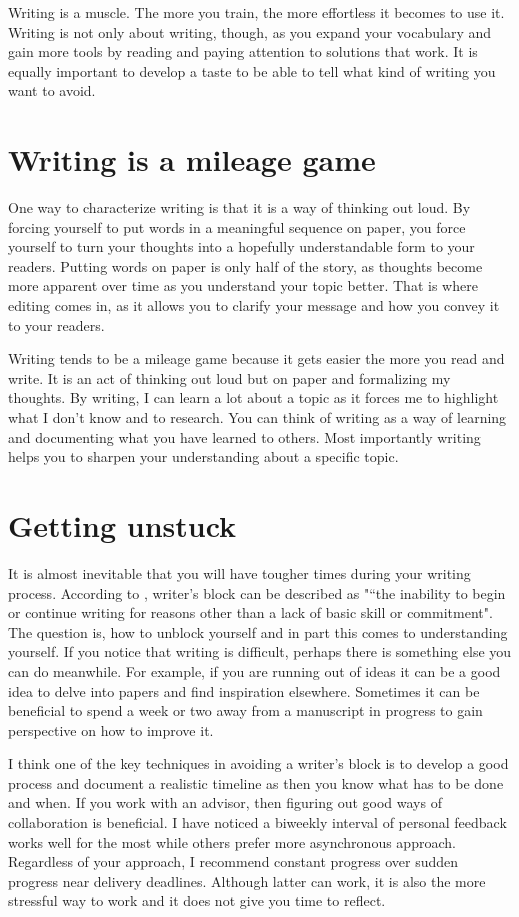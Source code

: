 Writing is a muscle.
The more you train, the more effortless it becomes to use it.
Writing is not only about writing, though, as you expand your vocabulary and gain more tools by reading and paying attention to solutions that work.
It is equally important to develop a taste to be able to tell what kind of writing you want to avoid.

\section{Writing is a mileage game}

One way to characterize writing is that it is a way of thinking out loud.
By forcing yourself to put words in a meaningful sequence on paper, you force yourself to turn your thoughts into a hopefully understandable form to your readers.
Putting words on paper is only half of the story, as thoughts become more apparent over time as you understand your topic better.
That is where editing comes in, as it allows you to clarify your message and how you convey it to your readers.

Writing tends to be a mileage game because it gets easier the more you read and write.
It is an act of thinking out loud but on paper and formalizing my thoughts.
By writing, I can learn a lot about a topic as it forces me to highlight what I don't know and to research.
You can think of writing as a way of learning and documenting what you have learned to others.
Most importantly writing helps you to sharpen your understanding about a specific topic.

\section{Getting unstuck}

It is almost inevitable that you will have tougher times during your writing process. According to \citet{rose2009writer}, writer's block can be described as "“the inability to begin or continue writing for reasons other than a lack of basic skill or commitment".
The question is, how to unblock yourself and in part this comes to understanding yourself.
If you notice that writing is difficult, perhaps there is something else you can do meanwhile.
For example, if you are running out of ideas it can be a good idea to delve into papers and find inspiration elsewhere.
Sometimes it can be beneficial to spend a week or two away from a manuscript in progress to gain perspective on how to improve it.

I think one of the key techniques in avoiding a writer's block is to develop a good process and document a realistic timeline as then you know what has to be done and when.
If you work with an advisor, then figuring out good ways of collaboration is beneficial. I have noticed a biweekly interval of personal feedback works well for the most while others prefer more asynchronous approach.
Regardless of your approach, I recommend constant progress over sudden progress near delivery deadlines.
Although latter can work, it is also the more stressful way to work and it does not give you time to reflect.

